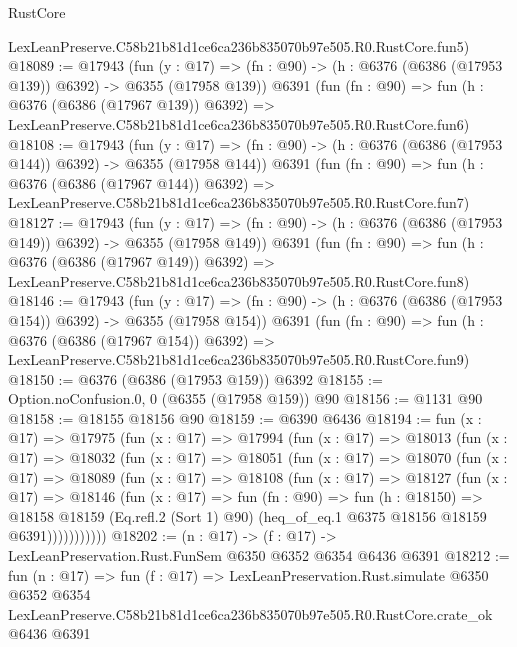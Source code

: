 \begin{lexlean}{RustCore}
\begin{coremodule}
    LexLeanPreserve.C58b21b81d1ce6ca236b835070b97e505.R0.RustCore.fun5)
@18089 := @17943
    (fun (y : @17) => (fn : @90) -> (h : @6376 (@6386 (@17953 @139)) @6392) -> @6355 (@17958 @139))
    @6391
    (fun (fn : @90) =>
    fun (h : @6376 (@6386 (@17967 @139)) @6392) =>
    LexLeanPreserve.C58b21b81d1ce6ca236b835070b97e505.R0.RustCore.fun6)
@18108 := @17943
    (fun (y : @17) => (fn : @90) -> (h : @6376 (@6386 (@17953 @144)) @6392) -> @6355 (@17958 @144))
    @6391
    (fun (fn : @90) =>
    fun (h : @6376 (@6386 (@17967 @144)) @6392) =>
    LexLeanPreserve.C58b21b81d1ce6ca236b835070b97e505.R0.RustCore.fun7)
@18127 := @17943
    (fun (y : @17) => (fn : @90) -> (h : @6376 (@6386 (@17953 @149)) @6392) -> @6355 (@17958 @149))
    @6391
    (fun (fn : @90) =>
    fun (h : @6376 (@6386 (@17967 @149)) @6392) =>
    LexLeanPreserve.C58b21b81d1ce6ca236b835070b97e505.R0.RustCore.fun8)
@18146 := @17943
    (fun (y : @17) => (fn : @90) -> (h : @6376 (@6386 (@17953 @154)) @6392) -> @6355 (@17958 @154))
    @6391
    (fun (fn : @90) =>
    fun (h : @6376 (@6386 (@17967 @154)) @6392) =>
    LexLeanPreserve.C58b21b81d1ce6ca236b835070b97e505.R0.RustCore.fun9)
@18150 := @6376 (@6386 (@17953 @159)) @6392
@18155 := Option.noConfusion.{0, 0} (@6355 (@17958 @159)) @90
@18156 := @1131 @90
@18158 := @18155 @18156 @90
@18159 := @6390 @6436
@18194 := fun (x : @17) =>
  @17975
    (fun (x : @17) =>
    @17994
      (fun (x : @17) =>
      @18013
        (fun (x : @17) =>
        @18032
          (fun (x : @17) =>
          @18051
            (fun (x : @17) =>
            @18070
              (fun (x : @17) =>
              @18089
                (fun (x : @17) =>
                @18108
                  (fun (x : @17) =>
                  @18127
                    (fun (x : @17) =>
                    @18146
                      (fun (x : @17) =>
                      fun (fn : @90) =>
                      fun (h : @18150) =>
                      @18158
                        @18159
                        (Eq.refl.{2} (Sort 1) @90)
                        (heq_of_eq.{1} @6375 @18156 @18159 @6391)))))))))))
@18202 := (n : @17) -> (f : @17) -> LexLeanPreservation.Rust.FunSem @6350 @6352 @6354 @6436 @6391
@18212 := fun (n : @17) =>
  fun (f : @17) =>
  LexLeanPreservation.Rust.simulate
    @6350
    @6352
    @6354
    LexLeanPreserve.C58b21b81d1ce6ca236b835070b97e505.R0.RustCore.crate_ok
    @6436
    @6391
\end{coremodule}
\end{lexlean}
